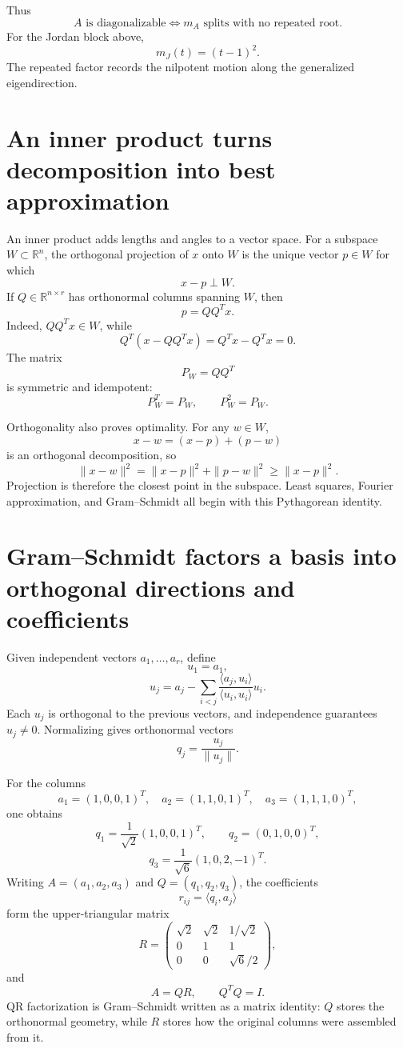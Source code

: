 Thus
\[
  \boxed{
  A\text{ is diagonalizable}
  \iff
  m_A\text{ splits with no repeated root}.}
\]
For the Jordan block above,
\[
  m_J(t)=(t-1)^2.
\]
The repeated factor records the nilpotent motion along the generalized eigendirection.

\section{An inner product turns decomposition into best approximation}

An inner product adds lengths and angles to a vector space.  For a subspace \(W\subset\mathbb R^n\), the orthogonal projection of \(x\) onto \(W\) is the unique vector \(p\in W\) for which
\[
  x-p\perp W.
\]
If \(Q\in\mathbb R^{n\times r}\) has orthonormal columns spanning \(W\), then
\[
  p=QQ^Tx.
\]
Indeed, \(QQ^Tx\in W\), while
\[
  Q^T(x-QQ^Tx)=Q^Tx-Q^Tx=0.
\]
The matrix
\[
  P_W=QQ^T
\]
is symmetric and idempotent:
\[
  P_W^T=P_W,
  \qquad
  P_W^2=P_W.
\]

Orthogonality also proves optimality.  For any \(w\in W\),
\[
  x-w=(x-p)+(p-w)
\]
is an orthogonal decomposition, so
\[
  \|x-w\|^2
  =\|x-p\|^2+\|p-w\|^2
  \ge\|x-p\|^2.
\]
Projection is therefore the closest point in the subspace.  Least squares, Fourier approximation, and Gram--Schmidt all begin with this Pythagorean identity.

\section{Gram--Schmidt factors a basis into orthogonal directions and coefficients}

Given independent vectors \(a_1,\ldots,a_r\), define
\[
  u_1=a_1,
\]
\[
  u_j=a_j-
  \sum_{i<j}
  \frac{\langle a_j,u_i\rangle}
       {\langle u_i,u_i\rangle}u_i.
\]
Each \(u_j\) is orthogonal to the previous vectors, and independence guarantees \(u_j\ne0\).  Normalizing gives orthonormal vectors
\[
  q_j=\frac{u_j}{\|u_j\|}.
\]

For the columns
\[
  a_1=(1,0,0,1)^T,
  \quad
  a_2=(1,1,0,1)^T,
  \quad
  a_3=(1,1,1,0)^T,
\]
one obtains
\[
  q_1=\frac1{\sqrt2}(1,0,0,1)^T,
  \qquad
  q_2=(0,1,0,0)^T,
\]
\[
  q_3=\frac1{\sqrt6}(1,0,2,-1)^T.
\]
Writing \(A=(a_1,a_2,a_3)\) and \(Q=(q_1,q_2,q_3)\), the coefficients
\[
  r_{ij}=\langle q_i,a_j\rangle
\]
form the upper-triangular matrix
\[
  R=
  \begin{pmatrix}
    \sqrt2&\sqrt2&1/\sqrt2\\
    0&1&1\\
    0&0&\sqrt6/2
  \end{pmatrix},
\]
and
\[
  \boxed{A=QR,\qquad Q^TQ=I.}
\]
QR factorization is Gram--Schmidt written as a matrix identity: \(Q\) stores the orthonormal geometry, while \(R\) stores how the original columns were assembled from it.

